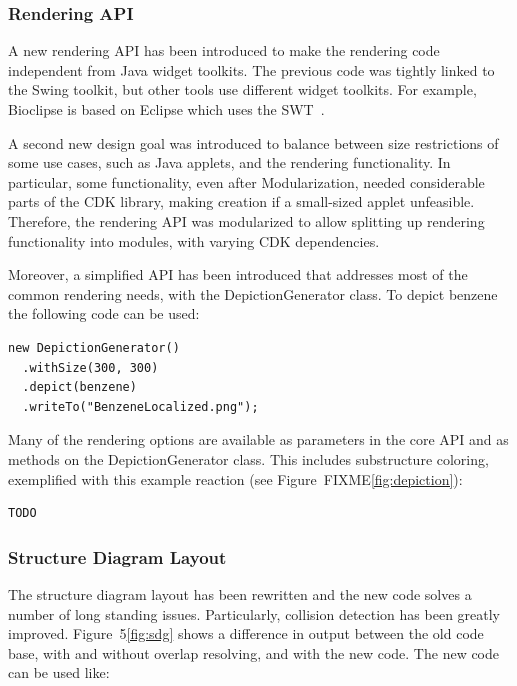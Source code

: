 \documentclass[10pt]{bmcart}
\begin{document}
\begin{verbatim}
\end{verbatim}

  \subsubsection*{Rendering API}

  A new rendering API has been introduced to make the rendering code independent
  from Java widget toolkits. The previous code was tightly linked to the Swing
  toolkit, but other tools use different widget toolkits. For example, Bioclipse
  is based on Eclipse which uses the SWT~\cite{spjuth2007bioclipse}. %
  
  A second new design goal was introduced to balance between size restrictions
  of some use cases, such as Java applets, and the rendering functionality. In
  particular, some functionality, even after Modularization, needed considerable
  parts of the CDK library, making creation if a small-sized applet unfeasible.
  Therefore, the rendering API was modularized to allow splitting up rendering
  functionality into modules, with varying CDK dependencies.
  
  
  Moreover, a simplified API has been introduced that addresses most of the
  common rendering needs, with the DepictionGenerator class. To depict benzene
  the following code can be used:

\begin{verbatim}
new DepictionGenerator()
  .withSize(300, 300)
  .depict(benzene)
  .writeTo("BenzeneLocalized.png");
\end{verbatim}

  Many of the rendering options are available as parameters in the core API
  and as methods on the DepictionGenerator class. This includes substructure
  coloring, exemplified with this example reaction (see Figure~FIXME\ref{fig:depiction}):

\begin{verbatim}
TODO
\end{verbatim}

  \subsubsection*{Structure Diagram Layout}

  The structure diagram layout has been rewritten and the new code solves a
  number of long standing issues. Particularly, collision detection has been
  greatly improved. Figure~5\ref{fig:sdg} shows a difference in output between
  the old code base, with and without overlap resolving, and with the new code.
  The new code can be used like:
\end{document}
